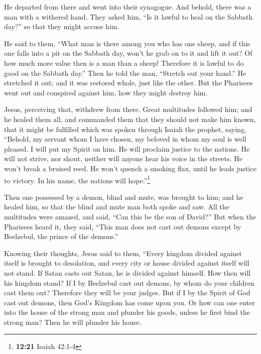  He departed from there and went into their synagogue.
 And behold, there was a man with a withered hand. They
asked him, ``Is it lawful to heal on the Sabbath day?'' so that they
might accuse him.

 He said to them, ``What man is there among you who has
one sheep, and if this one falls into a pit on the Sabbath day, won't he
grab on to it and lift it out?  Of how much more value
then is a man than a sheep! Therefore it is lawful to do good on the
Sabbath day.''  Then he told the man, ``Stretch out your
hand.'' He stretched it out; and it was restored whole, just like the
other.  But the Pharisees went out and conspired against
him, how they might destroy him.

 Jesus, perceiving that, withdrew from there. Great
multitudes followed him; and he healed them all,  and
commanded them that they should not make him known,  that
it might be fulfilled which was spoken through Isaiah the prophet,
saying,  ``Behold, my servant whom I have chosen, my
beloved in whom my soul is well pleased. I will put my Spirit on him. He
will proclaim justice to the nations.  He will not
strive, nor shout, neither will anyone hear his voice in the streets.
 He won't break a bruised reed. He won't quench a smoking
flax, until he leads justice to victory.  In his name,
the nations will hope.''\footnote{\textbf{12:21} Isaiah 42:1-4}

 Then one possessed by a demon, blind and mute, was
brought to him; and he healed him, so that the blind and mute man both
spoke and saw.  All the multitudes were amazed, and said,
``Can this be the son of David?''  But when the Pharisees
heard it, they said, ``This man does not cast out demons except by
Beelzebul, the prince of the demons.''

 Knowing their thoughts, Jesus said to them, ``Every
kingdom divided against itself is brought to desolation, and every city
or house divided against itself will not stand.  If Satan
casts out Satan, he is divided against himself. How then will his
kingdom stand?  If I by Beelzebul cast out demons, by
whom do your children cast them out? Therefore they will be your judges.
 But if I by the Spirit of God cast out demons, then
God's Kingdom has come upon you.  Or how can one enter
into the house of the strong man and plunder his goods, unless he first
bind the strong man? Then he will plunder his house.

